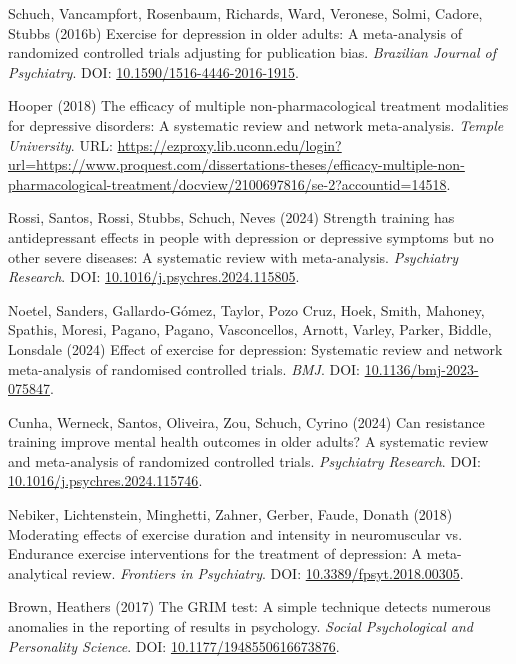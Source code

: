 \documentclass[
  letterpaper,
  DIV=11,
  numbers=noendperiod]{scrartcl}
\newlength{\cslhangindent}
\newenvironment{CSLReferences}[2] %
 {\begin{list}{}{%
  \setlength{\itemindent}{0pt}
  \setlength{\leftmargin}{0pt}
  \setlength{\parsep}{0pt}
  \ifodd #1
   \setlength{\leftmargin}{\cslhangindent}
   \setlength{\itemindent}{-1\cslhangindent}
  \fi
  \setlength{\itemsep}{#2\baselineskip}}}
 {\end{list}}
\begin{document}
\begin{CSLReferences}{0}{1}
Schuch, Vancampfort, Rosenbaum, Richards, Ward, Veronese, Solmi, Cadore,
Stubbs (2016b) Exercise for depression in older adults: A meta-analysis
of randomized controlled trials adjusting for publication bias.
\emph{Brazilian Journal of Psychiatry}. DOI:
\href{https://doi.org/10.1590/1516-4446-2016-1915}{10.1590/1516-4446-2016-1915}.

Hooper (2018) The efficacy of multiple non-pharmacological treatment
modalities for depressive disorders: A systematic review and network
meta-analysis. \emph{Temple University}. URL:
\url{https://ezproxy.lib.uconn.edu/login?url=https://www.proquest.com/dissertations-theses/efficacy-multiple-non-pharmacological-treatment/docview/2100697816/se-2?accountid=14518}.

Rossi, Santos, Rossi, Stubbs, Schuch, Neves (2024) Strength training has
antidepressant effects in people with depression or depressive symptoms
but no other severe diseases: A systematic review with meta-analysis.
\emph{Psychiatry Research}. DOI:
\href{https://doi.org/10.1016/j.psychres.2024.115805}{10.1016/j.psychres.2024.115805}.

Noetel, Sanders, Gallardo-Gómez, Taylor, Pozo Cruz, Hoek, Smith,
Mahoney, Spathis, Moresi, Pagano, Pagano, Vasconcellos, Arnott, Varley,
Parker, Biddle, Lonsdale (2024) Effect of exercise for depression:
Systematic review and network meta-analysis of randomised controlled
trials. \emph{BMJ}. DOI:
\href{https://doi.org/10.1136/bmj-2023-075847}{10.1136/bmj-2023-075847}.

Cunha, Werneck, Santos, Oliveira, Zou, Schuch, Cyrino (2024) Can
resistance training improve mental health outcomes in older adults? A
systematic review and meta-analysis of randomized controlled trials.
\emph{Psychiatry Research}. DOI:
\href{https://doi.org/10.1016/j.psychres.2024.115746}{10.1016/j.psychres.2024.115746}.

Nebiker, Lichtenstein, Minghetti, Zahner, Gerber, Faude, Donath (2018)
Moderating effects of exercise duration and intensity in neuromuscular
vs. Endurance exercise interventions for the treatment of depression: A
meta-analytical review. \emph{Frontiers in Psychiatry}. DOI:
\href{https://doi.org/10.3389/fpsyt.2018.00305}{10.3389/fpsyt.2018.00305}.

Brown, Heathers (2017) The GRIM test: A simple technique detects
numerous anomalies in the reporting of results in psychology.
\emph{Social Psychological and Personality Science}. DOI:
\href{https://doi.org/10.1177/1948550616673876}{10.1177/1948550616673876}.


\end{CSLReferences}
\end{document}
